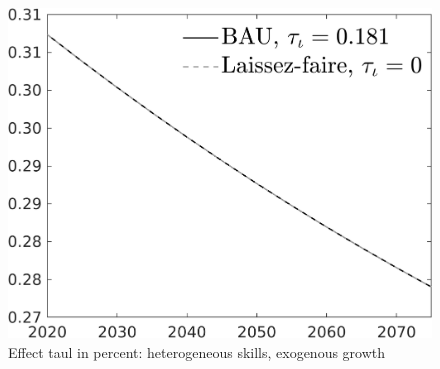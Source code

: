 \documentclass[12pt]{article}
\begin{document}
\begin{figure}[h!!]
	\centering
	\caption{Effect taul in percent: heterogeneous skills, exogenous growth}\label{fig:LF_BAU_nsk0_xgr13}
	
	\begin{minipage}[]{0.32\textwidth}
		\includegraphics[width=1\textwidth]{../../codding_model/own_basedOnFried/optimalPol_010922_revision/figures/all_13Sept22/CompTaul_LFBAU_Reg0_pf_spillover0_nsk0_xgr1_knspil0_sep1_countec0_GovRev0_etaa0.79_lgd1.png}

\end{minipage}
\end{figure}
\end{document}
